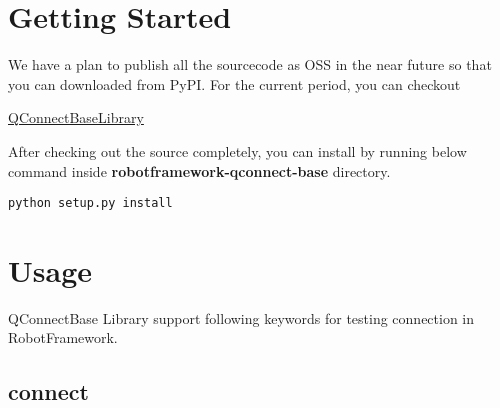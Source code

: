 %
%

\hypertarget{description-getting-started}{%
\section{Getting Started}\label{description-getting-started}}

We have a plan to publish all the sourcecode as OSS in the near future
so that you can downloaded from PyPI. For the current period, you can
checkout

\href{https://github.com/test-fullautomation/robotframework-qconnect-base}{QConnectBaseLibrary}

After checking out the source completely, you can install by running
below command inside \textbf{robotframework-qconnect-base} directory.

\begin{verbatim}
python setup.py install
\end{verbatim}

\hypertarget{description-usage}{%
\section{Usage}\label{description-usage}}

QConnectBase Library support following keywords for testing connection
in RobotFramework.

\hypertarget{description-connect}{%
\subsection{\texorpdfstring{\textbf{connect}}{connect}}\label{description-connect}}

